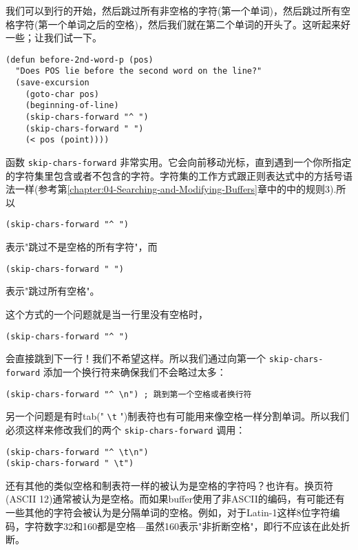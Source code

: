 我们可以到行的开始，然后跳过所有非空格的字符(第一个单词)，然后跳过所有空格字符(第一个单词之后的空格)，然后我们就在第二个单词的开头了。这听起来好一些；让我们试一下。

\begin{verbatim}
(defun before-2nd-word-p (pos)
  "Does POS lie before the second word on the line?"
  (save-excursion
    (goto-char pos)
    (beginning-of-line)
    (skip-chars-forward "^ ")
    (skip-chars-forward " ")
    (< pos (point))))
\end{verbatim}

函数 \texttt{skip-chars-forward} 非常实用。它会向前移动光标，直到遇到一个你所指定的字符集里包含或者不包含的字符。字符集的工作方式跟正则表达式中的方括号语法一样(参考第\ref{chapter:04-Searching-and-Modifying-Buffers}章中的中的规则3).所以

\begin{verbatim}
(skip-chars-forward "^ ")
\end{verbatim}

表示"跳过不是空格的所有字符"，而

\begin{verbatim}
(skip-chars-forward " ")
\end{verbatim}

表示"跳过所有空格"。

这个方式的一个问题就是当一行里没有空格时，

\begin{verbatim}
(skip-chars-forward "^ ")
\end{verbatim}

会直接跳到下一行！我们不希望这样。所以我们通过向第一个 \texttt{skip-chars-forward} 添加一个换行符来确保我们不会略过太多：

\begin{verbatim}
(skip-chars-forward "^ \n") ; 跳到第一个空格或者换行符
\end{verbatim}

另一个问题是有时tab(" \verb|\t| ")制表符也有可能用来像空格一样分割单词。所以我们必须这样来修改我们的两个 \texttt{skip-chars-forward} 调用：

\begin{verbatim}
(skip-chars-forward "^ \t\n")
(skip-chars-forward " \t")
\end{verbatim}

还有其他的类似空格和制表符一样的被认为是空格的字符吗？也许有。换页符(ASCII 12)通常被认为是空格。而如果buffer使用了非ASCII的编码，有可能还有一些其他的字符会被认为是分隔单词的空格。例如，对于Latin-1这样8位字符编码，字符数字32和160都是空格---虽然160表示"非折断空格"，即行不应该在此处折断。

